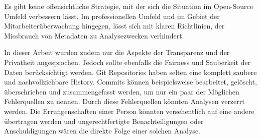 \documentclass[12pt,a4paper]{article}
\begin{document}
Es gibt keine offensichtliche Strategie, mit der sich die Situation im Open-Source Umfeld verbessern lässt.
Im professionellen Umfeld und im Gebiet der Mitarbeiterüberwachung hingegen, lässt sich mit klaren Richtlinien, der Missbrauch von Metadaten zu Analysezwecken verhindert.

In dieser Arbeit wurden zudem nur die Aspekte der Transparenz und der Privatheit angesprochen.
Jedoch sollte ebenfalls die Fairness und Sauberkeit der Daten berücksichtigt werden.
Git Repositories haben selten eine komplett saubere und nachvollziehbare History.
Commits können beispielsweise bearbeitet, gelöscht, überschrieben und zusammengefasst werden, um nur ein paar der Möglichen Fehlerquellen zu nennen.
Durch diese Fehlerquellen könnten Analysen verzerrt werden.
Die Errungenschaften einer Person könnten versehentlich auf eine andere übertragen werden und ungerechtfertigte Benachteiligungen oder Anschuldigungen wären die direkte Folge einer solchen Analyse.

\printbibliography
\end{document}
